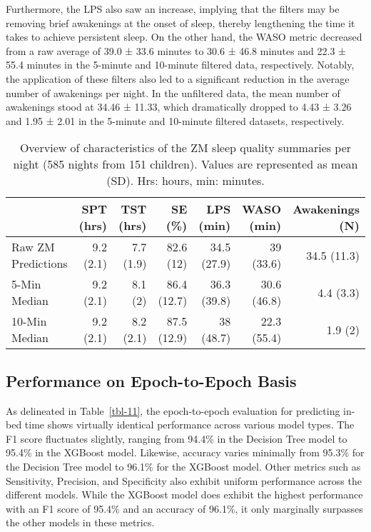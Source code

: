 \documentclass[
  10pt,
]{scrbook}
\begin{document}
Furthermore, the LPS also saw an increase, implying that the filters may
be removing brief awakenings at the onset of sleep, thereby lengthening
the time it takes to achieve persistent sleep. On the other hand, the
WASO metric decreased from a raw average of 39.0 ± 33.6 minutes to 30.6
± 46.8 minutes and 22.3 ± 55.4 minutes in the 5-minute and 10-minute
filtered data, respectively. Notably, the application of these filters
also led to a significant reduction in the average number of awakenings
per night. In the unfiltered data, the mean number of awakenings stood
at 34.46 ± 11.33, which dramatically dropped to 4.43 ± 3.26 and 1.95 ±
2.01 in the 5-minute and 10-minute filtered datasets, respectively.

\begingroup

\footnotesize

\hypertarget{tbl-10}{}
\begin{longtable}{lrrrrrr}
\caption{\label{tbl-10}Overview of characteristics of the ZM sleep quality summaries per night
(585 nights from 151 children). Values are represented as mean (SD).
Hrs: hours, min: minutes. }\tabularnewline

\toprule
 & SPT (hrs) & TST (hrs) & SE (\%) & LPS (min) & WASO (min) & Awakenings (N) \\ 
\midrule
Raw ZM Predictions & 9.2 (2.1) & 7.7 (1.9) & 82.6 (12) & 34.5 (27.9) & 39 (33.6) & 34.5 (11.3) \\ 
5-Min Median & 9.2 (2.1) & 8.1 (2) & 86.4 (12.7) & 36.3 (39.8) & 30.6 (46.8) & 4.4 (3.3) \\ 
10-Min Median & 9.2 (2.1) & 8.2 (2.1) & 87.5 (12.9) & 38 (48.7) & 22.3 (55.4) & 1.9 (2) \\ 
\bottomrule
\end{longtable}

\endgroup

\hypertarget{performance-on-epoch-to-epoch-basis}{%
\subsection{Performance on Epoch-to-Epoch
Basis}\label{performance-on-epoch-to-epoch-basis}}

As delineated in Table~\ref{tbl-11}, the epoch-to-epoch evaluation for
predicting in-bed time shows virtually identical performance across
various model types. The F1 score fluctuates slightly, ranging from
94.4\% in the Decision Tree model to 95.4\% in the XGBoost model.
Likewise, accuracy varies minimally from 95.3\% for the Decision Tree
model to 96.1\% for the XGBoost model. Other metrics such as
Sensitivity, Precision, and Specificity also exhibit uniform performance
across the different models. While the XGBoost model does exhibit the
highest performance with an F1 score of 95.4\% and an accuracy of
96.1\%, it only marginally surpasses the other models in these metrics.
\end{document}
